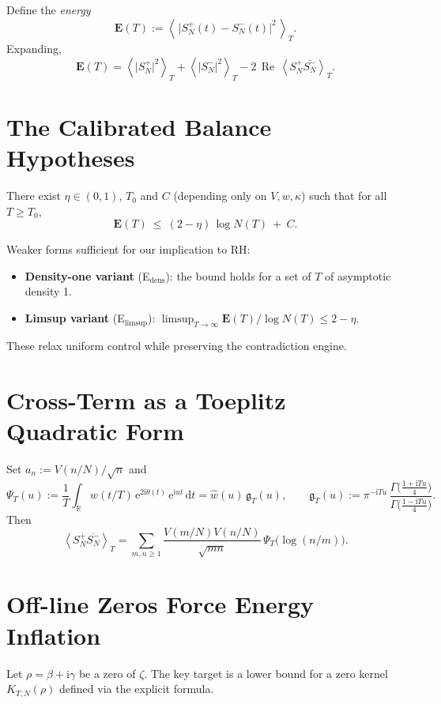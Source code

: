 \documentclass[11pt]{article}
\newcommand{\RR}{\mathbb{R}}
\newcommand{\EE}{\mathbf{E}}
\newcommand{\e}{\mathrm{e}}
\newcommand{\ii}{\mathrm{i}}
\newcommand{\dd}{\mathrm{d}}
\newcommand{\avg}[1]{\left\langle #1 \right\rangle}
\newcommand{\widehatw}{\widehat{w}}
\newcommand{\Rea}{\operatorname{Re}}
\newcommand{\zetaR}{\zeta}
\newcommand{\thetaRS}{\theta}
\begin{document}
Define the \emph{energy}
\begin{equation}
\EE(T):=\avg{\,\lvert S_N^+(t)-S_N^-(t)\rvert^2\,}_T.
\end{equation}
Expanding,
\begin{equation}
\EE(T)=\avg{\lvert S_N^+\rvert^2}_T+\avg{\lvert S_N^-\rvert^2}_T-2\,\Rea\,\avg{ S_N^+\overline{S_N^-}}_T.
\tag{0.1}
\end{equation}

\section{The Calibrated Balance Hypotheses}
\begin{conjecture}[Conjecture E$'$]\label{conj:Eprime}
There exist $\eta\in(0,1)$, $T_0$ and $C$ (depending only on $V,w,\kappa$) such that for all $T\ge T_0$,
\begin{equation}
\EE(T)\ \le\ (2-\eta)\,\log N(T)\ +\ C.
\tag{E$'$}
\end{equation}
\end{conjecture}
Weaker forms sufficient for our implication to RH:
\begin{itemize}[leftmargin=2.25em]
  \item \textbf{Density-one variant} (E$_\mathrm{dens}$): the bound holds for a set of $T$ of asymptotic density 1.
  \item \textbf{Limsup variant} (E$_\mathrm{limsup}$): $\limsup_{T\to\infty} \EE(T)/\log N(T)\le 2-\eta$.
\end{itemize}
These relax uniform control while preserving the contradiction engine.

\section{Cross-Term as a Toeplitz Quadratic Form}
Set $a_n:=V(n/N)/\sqrt{n}$ and
\begin{equation}
\Psi_T(u):=\frac1T\int_{\RR} w(t/T)\,\e^{2\ii\thetaRS(t)}\,\e^{\ii u t}\,\dd t
=\widehatw(u)\,\mathfrak{g}_T(u),\qquad
\mathfrak{g}_T(u):=\pi^{-\ii T u}\,\frac{\Gamma\big(\tfrac{1+\ii T u}{4}\big)}{\Gamma\big(\tfrac{1-\ii T u}{4}\big)}.
\end{equation}
Then
\begin{equation}
\avg{ S_N^+\overline{S_N^-}}_T
=\sum_{m,n\ge1}\frac{V(m/N)V(n/N)}{\sqrt{mn}}\,\Psi_T\!\big(\log(n/m)\big).
\tag{2.2}
\end{equation}

\section{Off-line Zeros Force Energy Inflation}
Let $\rho=\beta+\ii\gamma$ be a zero of $\zetaR$. The key target is a lower bound for a zero kernel $K_{T,N}(\rho)$ defined via the explicit formula.
\end{document}
